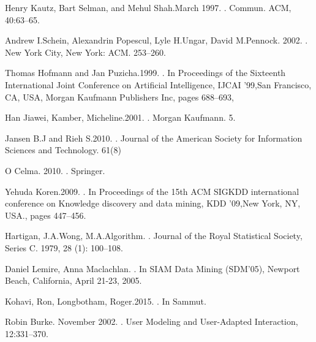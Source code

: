 \begin{thebibliography}{10}
Henry Kautz, Bart Selman, and Mehul Shah.March 1997.
.
\newblock Commun. ACM, 40:63–65.

Andrew I.Schein, Alexandrin Popescul, Lyle H.Ungar, David M.Pennock. 2002.
.
\newblock New York City, New York: ACM. 253–260.

Thomas Hofmann and Jan Puzicha.1999. 
.
\newblock In Proceedings of the Sixteenth International Joint Conference on Artificial Intelligence, IJCAI ’99,San Francisco, CA, USA, Morgan Kaufmann Publishers Inc, pages 688–693, 

Han Jiawei, Kamber, Micheline.2001.
.
\newblock Morgan Kaufmann. 5.

Jansen B.J and Rieh S.2010.
.
\newblock Journal of the American Society for Information Sciences and Technology. 61(8)

O Celma. 2010.
.
\newblock Springer. 

Yehuda Koren.2009.
.
\newblock In Proceedings of the 15th ACM SIGKDD international conference on Knowledge discovery and data mining, KDD ’09,New York, NY, USA., pages 447–456.

Hartigan, J.A.Wong, M.A.Algorithm.
.
\newblock Journal of the Royal Statistical Society, Series C. 1979, 28 (1): 100–108.

Daniel Lemire, Anna Maclachlan.
.
\newblock In SIAM Data Mining (SDM'05), Newport Beach, California, April 21-23, 2005.

Kohavi, Ron, Longbotham, Roger.2015.
.
\newblock In Sammut.



Robin Burke. November 2002.
.
\newblock User Modeling and User-Adapted Interaction, 12:331–370.


\end{thebibliography}
